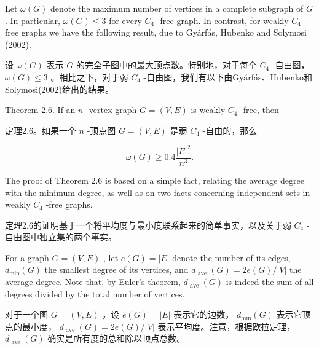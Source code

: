 \documentclass[10pt]{article}
\begin{document}
Let \(\omega \left( G\right)\) denote the maximum number of vertices in a complete subgraph of \(G\) . In particular, \(\omega \left( G\right)  \leq  3\) for every \({C}_{4}\) -free graph. In contrast, for weakly \({C}_{4}\) -free graphs we have the following result, due to Gyárfás, Hubenko and Solymosi (2002).

\begin{tcolorbox}\relax
设 \(\omega \left( G\right)\) 表示 \(G\) 的完全子图中的最大顶点数。特别地，对于每个 \({C}_{4}\) -自由图， \(\omega \left( G\right)  \leq  3\) 。相比之下，对于弱 \({C}_{4}\) -自由图，我们有以下由Gyárfás、Hubenko和Solymosi(2002)给出的结果。
\end{tcolorbox}

Theorem 2.6. If an \(n\) -vertex graph \(G = \left( {V,E}\right)\) is weakly \({C}_{4}\) -free, then

\begin{tcolorbox}\relax
定理2.6。如果一个 \(n\) -顶点图 \(G = \left( {V,E}\right)\) 是弱 \({C}_{4}\) -自由的，那么
\end{tcolorbox}

\[
\omega \left( G\right)  \geq  {0.4}\frac{{\left| E\right| }^{2}}{{n}^{3}}.
\]

The proof of Theorem 2.6 is based on a simple fact, relating the average degree with the minimum degree, as well as on two facts concerning independent sets in weakly \({C}_{4}\) -free graphs.

\begin{tcolorbox}\relax
定理2.6的证明基于一个将平均度与最小度联系起来的简单事实，以及关于弱 \({C}_{4}\) -自由图中独立集的两个事实。
\end{tcolorbox}

For a graph \(G = \left( {V,E}\right)\) , let \(e\left( G\right)  = \left| E\right|\) denote the number of its edges, \({d}_{\min }\left( G\right)\) the smallest degree of its vertices, and \({d}_{\text{ ave }}\left( G\right)  = {2e}\left( G\right) /\left| V\right|\) the average degree. Note that, by Euler’s theorem, \({d}_{\text{ ave }}\left( G\right)\) is indeed the sum of all degrees divided by the total number of vertices.

\begin{tcolorbox}\relax
对于一个图 \(G = \left( {V,E}\right)\) ，设 \(e\left( G\right)  = \left| E\right|\) 表示它的边数， \({d}_{\min }\left( G\right)\) 表示它顶点的最小度， \({d}_{\text{ ave }}\left( G\right)  = {2e}\left( G\right) /\left| V\right|\) 表示平均度。注意，根据欧拉定理， \({d}_{\text{ ave }}\left( G\right)\) 确实是所有度的总和除以顶点总数。
\end{tcolorbox}
\end{document}
